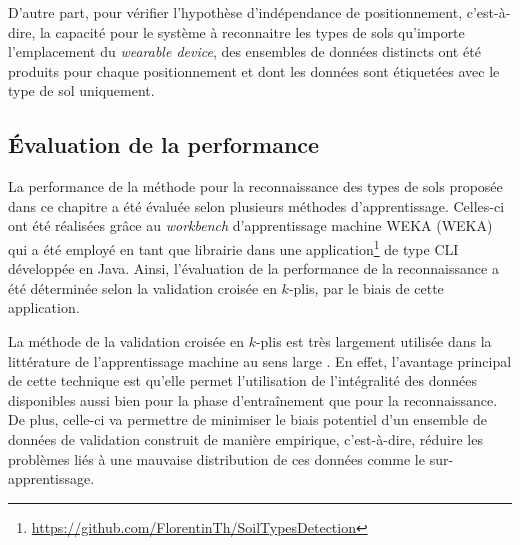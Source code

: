 D'autre part, pour vérifier l'hypothèse d'indépendance de positionnement, c'est-à-dire, la capacité pour le système à reconnaitre les types de sols qu'importe l'emplacement du \textit{wearable device}, des ensembles de données distincts ont été produits pour chaque positionnement et dont les données sont étiquetées avec le type de sol uniquement.

\subsection{Évaluation de la performance}

La performance de la méthode pour la reconnaissance des types de sols proposée dans ce chapitre a été évaluée selon plusieurs méthodes d'apprentissage. Celles-ci ont été réalisées grâce au \textit{workbench} d'apprentissage machine \acs{WEKA} (\acl{WEKA}) \citep{Holmes1994} qui a été employé en tant que librairie dans une application\footnote{\url{https://github.com/FlorentinTh/SoilTypesDetection}} de type \ac{CLI} développée en Java. Ainsi, l'évaluation de la performance de la reconnaissance a été déterminée selon la validation croisée en $k$-plis, par le biais de cette application.

La méthode de la validation croisée en $k$-plis est très largement utilisée dans la littérature de l'apprentissage machine au sens large \citep{Vail2004, Arlot2010, Kertesz2016}. En effet, l'avantage principal de cette technique est qu'elle permet l'utilisation de l'intégralité des données disponibles aussi bien pour la phase d'entraînement que pour la reconnaissance. De plus, celle-ci va permettre de minimiser le biais potentiel d'un ensemble de données de validation construit de manière empirique, c'est-à-dire, réduire les problèmes liés à une mauvaise distribution de ces données comme le sur-apprentissage.

